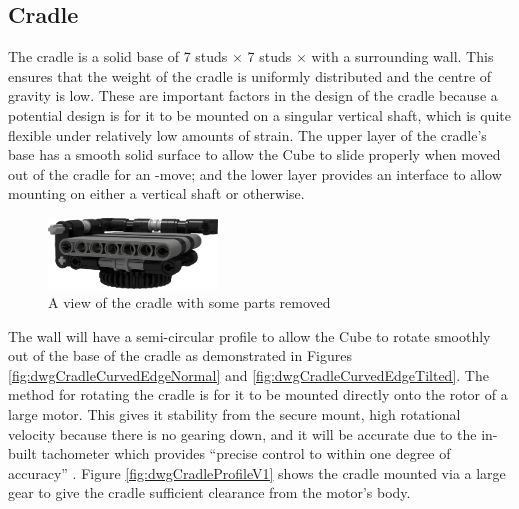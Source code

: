 \documentclass{report}
\newcommand{\move}[1]{\uppercase{\texttt{\formatmovesnospace{#1}}}-move}
\begin{document}
	\subsection{Cradle}
	
	The cradle is a solid base of 7 studs $\times$ 7 studs $\times$ with a surrounding wall. This ensures that the weight of the cradle is uniformly distributed and the centre of gravity is low. These are important factors in the design of the cradle because a potential design is for it to be mounted on a singular vertical shaft, which is quite flexible under relatively low amounts of strain. The upper layer of the cradle's base has a smooth solid surface to allow the Cube to slide properly when moved out of the cradle for an \move{x}; and the lower layer provides an interface to allow mounting on either a vertical shaft or otherwise.
	
	\begin{figure}[H]
		\centering
		\includegraphics[width=0.4\textwidth]{Resources/Images/rdrCradle.png}
		\caption{A view of the cradle with some parts removed}
		\label{fig:rdrCradle}
	\end{figure}
	
	The wall will have a semi-circular profile to allow the Cube to rotate smoothly out of the base of the cradle as demonstrated in Figures \ref{fig:dwgCradleCurvedEdgeNormal} and \ref{fig:dwgCradleCurvedEdgeTilted}. The method for rotating the cradle is for it to be mounted directly onto the rotor of a large motor. This gives it stability from the secure mount, high rotational velocity because there is no gearing down, and it will be accurate due to the in-built tachometer which provides \enquote{precise control to within one degree of accuracy} \cite{Lego}. Figure \ref{fig:dwgCradleProfileV1} shows the cradle mounted via a large gear to give the cradle sufficient clearance from the motor's body.
    
\end{document}

